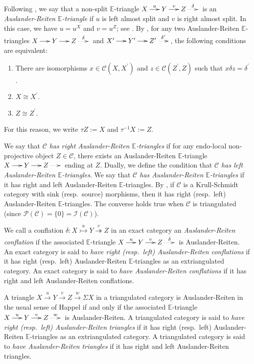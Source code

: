\documentclass[12pt]{amsart}
\makeatletter
\numberwithin{equation}{subsection}
\theoremstyle{plain}
\theoremstyle{definition}
\newcommand{\Proj}{\mathcal{P}}
\newcommand{\Inj}{\mathcal{I}}
\newcommand{\C}{\mathcal{C}}
\newcommand{\E}{\mathbb{E}}
\newcommand{\tri}[6]{\!\!\xymatrix@C=5mm{#1\ar[r]^-{#2}&#3\ar[r]^-{#4}&#5\ar@{..>}[r]^-{#6}&}\!\!}
\newcommand{\xrightarrowtail}[1]{\stackrel{#1}{\rightarrowtail}}
\newcommand{\xtwoheadrightarrow}[1]{\stackrel{#1}{\twoheadrightarrow}}
\makeatother
\begin{document}
Following \cite[Definition 2.1 and Proposition 2.10]{Iyama-Nakaoka-Palu_2024},  
we say that a non-split $\E$-triangle $\tri{X}{u}{Y}{v}{Z}{\delta}$ is an {\it Auslander-Reiten $\E$-triangle} if $u$ is left almost split and $v$ is right almost split. 
In this case, we have $u=u^X$ and $v=u^Z$; see \cite[Theorem 2.9]{Iyama-Nakaoka-Palu_2024}.
By \cite[Proposition 2.6]{Iyama-Nakaoka-Palu_2024}, for any two Auslander-Reiten $\E$-triangles $\tri{X}{}{Y}{}{Z}{\delta}$ and $\tri{X^\prime}{}{Y^\prime}{}{Z^\prime}{\delta^\prime}$, the following conditions are equivalent: 
\begin{enumerate}
    \item There are isomorphisms $x\in\C(X, X^\prime)$ and $z\in\C(Z^\prime, Z)$ such that $x \delta z = \delta^\prime$.
    \item $X\cong X^\prime$.
    \item $Z\cong Z^\prime$.
\end{enumerate}
For this reason, we write $\tau Z:= X$ and $\tau^{-1} X:= Z$.




We say that {\it $\C$ has right Auslander-Reiten $\E$-triangles} if for any endo-local non-projective object $Z\in\C$, there exists an Auslander-Reiten $\E$-triangle $\tri{X}{}{Y}{}{Z}{}$ ending at $Z$. 
Dually, we define the condition that {\it $\C$ has left Auslander-Reiten $\E$-triangles}.
We say that {\it $\C$ has Auslander-Reiten $\E$-triangles} if it has right and left Auslander-Reiten $\E$-triangles.
By \cite[Lemma 3.2]{Iyama-Nakaoka-Palu_2024}, if $\C$ is a Krull-Schmidt category with sink (resp.~source) morphisms, then it has right (resp.~left) Auslander-Reiten $\E$-triangles.
The converse holds true when $\C$ is triangulated (since $\Proj(\C)=\{0\}=\Inj(\C)$).




We call a conflation $\delta:X \xrightarrowtail{u} Y\xtwoheadrightarrow{v}Z$ in an exact category an {\it Auslander-Reiten conflation} if the associated $\E$-triangle $\tri{X}{u}{Y}{v}{Z}{\delta}$ is Auslander-Reiten. 
An exact category is said to {\it have right (resp.~left) Auslander-Reiten conflations} if it has right (resp.~left) Auslander-Reiten $\E$-triangles as an extriangulated category.
An exact category is said to {\it have  Auslander-Reiten conflations} if it has right and left Auslander-Reiten conflations.




A triangle $X\xrightarrow{u}Y\xrightarrow{v}Z\xrightarrow{w}\Sigma X$ in a triangulated category is Auslander-Reiten in the usual sense of Happel \cite[4.1]{Happel_book} if and only if the associated $\E$-triangle $\tri{X}{u}{Y}{v}{Z}{w}$ is Auslander-Reiten.
A triangulated category is said to {\it have right (resp.~left) Auslander-Reiten triangles} if it has right (resp.~left) Auslander-Reiten $\E$-triangles as an extriangulated category.
A triangulated category is said to {\it have Auslander-Reiten triangles} if it has right and left Auslander-Reiten triangles.
\end{document}

